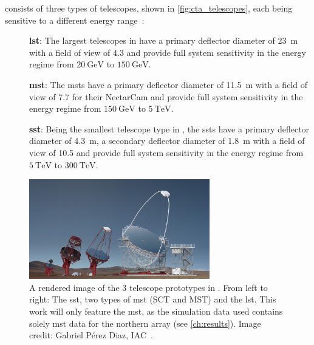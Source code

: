 \cta{} consists of three types of telescopes, shown in \autoref{fig:cta_telescopes}, each being
sensitive to a different energy range~\cite{cta_specs}:
\begin{description}
    \item [] \textbf{\gls{lst}}: The largest telescopes in \cta{} have a primary deflector diameter
    of \SI{23}{\meter} with a field of view of \SI{4.3}{\deg} and provide full system sensitivity in the energy
    regime from \(\SI{20}{\giga\eV}\) to \(\SI{150}{\giga\eV}\).
    \item [] \textbf{\gls{mst}}: The \glspl{mst} have a primary deflector diameter of \SI{11.5}{\meter}
    with a field of view of \SI{7.7}{\deg} for their NectarCam and provide full system sensitivity in the energy
    regime from \(\SI{150}{\giga\eV}\) to \(\SI{5}{\tera\eV}\).
    \item [] \textbf{\gls{sst}}: Being the smallest telescope type in \cta{}, the \glspl{sst}
    have a primary deflector diameter of \SI{4.3}{\meter}, a secondary deflector diameter of
    \SI{1.8}{\meter} with a field of view of \SI{10.5}{\deg} and provide full system sensitivity in the energy
    regime from \(\SI{5}{\tera\eV}\) to \(\SI{300}{\tera\eV}\).
\end{description}

\begin{figure}
    \centering
    \includegraphics[width=0.7\textwidth]{graphics/telescopes_render.jpg}
    \caption{A rendered image of the 3 telescope prototypes in \cta{}. From left to right: The \gls{sst},
    two types of \gls{mst} (SCT and MST) and the \gls{lst}. This work will only feature the \gls{mst}, as
    the simulation data used contains solely \gls{mst} data for the northern array (see \autoref{ch:results}).
    Image credit: Gabriel Pérez Diaz, IAC~\cite{cta_tech}.}%
    \label{fig:cta_telescopes}
\end{figure}

